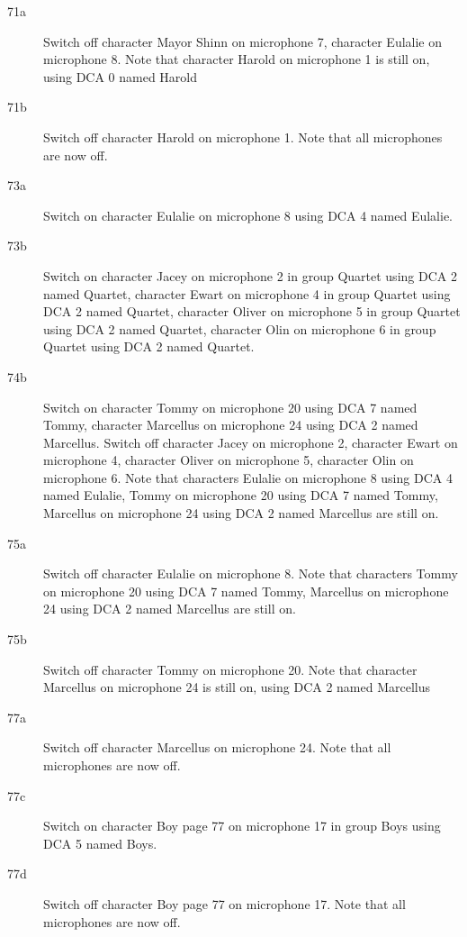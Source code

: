 \begin{description}
\item[71a]
Switch off character Mayor Shinn on microphone 7, character Eulalie on microphone 8. Note that character Harold on microphone 1 is still on, using DCA 0 named Harold

\item[71b]
Switch off character Harold on microphone 1. Note that all microphones are now off.

\item[73a]
Switch on character Eulalie on microphone 8 using DCA 4 named Eulalie. 

\item[73b]
Switch on character Jacey on microphone 2 in group Quartet using DCA 2 named Quartet, character Ewart on microphone 4 in group Quartet using DCA 2 named Quartet, character Oliver on microphone 5 in group Quartet using DCA 2 named Quartet, character Olin on microphone 6 in group Quartet using DCA 2 named Quartet. 

\item[74b]
Switch on character Tommy on microphone 20 using DCA 7 named Tommy, character Marcellus on microphone 24 using DCA 2 named Marcellus. Switch off character Jacey on microphone 2, character Ewart on microphone 4, character Oliver on microphone 5, character Olin on microphone 6. Note that characters Eulalie on microphone 8 using DCA 4 named Eulalie, Tommy on microphone 20 using DCA 7 named Tommy, Marcellus on microphone 24 using DCA 2 named Marcellus are still on.  

\item[75a]
Switch off character Eulalie on microphone 8. Note that characters Tommy on microphone 20 using DCA 7 named Tommy, Marcellus on microphone 24 using DCA 2 named Marcellus are still on.  

\item[75b]
Switch off character Tommy on microphone 20. Note that character Marcellus on microphone 24 is still on, using DCA 2 named Marcellus

\item[77a]
Switch off character Marcellus on microphone 24. Note that all microphones are now off.

\item[77c]
Switch on character Boy page 77 on microphone 17 in group Boys using DCA 5 named Boys. 

\item[77d]
Switch off character Boy page 77 on microphone 17. Note that all microphones are now off.


\end{description}
